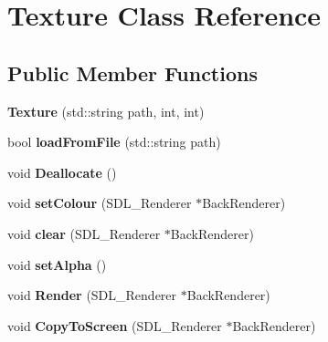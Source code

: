 \hypertarget{class_texture}{\section{Texture Class Reference}
\label{class_texture}
}
\subsection*{Public Member Functions}
\begin{DoxyCompactItemize}
\item 
\hypertarget{class_texture_aae2ae5192935d618e4f9de8d94bd89fd}{{\bfseries Texture} (std\+::string path, int, int)}\label{class_texture_aae2ae5192935d618e4f9de8d94bd89fd}

\item 
\hypertarget{class_texture_a28ddeead9d09927584663c5d2d582df2}{bool {\bfseries load\+From\+File} (std\+::string path)}\label{class_texture_a28ddeead9d09927584663c5d2d582df2}

\item 
\hypertarget{class_texture_a51f7aa720b0f538ee4dc9643d25b9fc5}{void {\bfseries Deallocate} ()}\label{class_texture_a51f7aa720b0f538ee4dc9643d25b9fc5}

\item 
\hypertarget{class_texture_a430b8ba2a5d32306903058de1bde5657}{void {\bfseries set\+Colour} (S\+D\+L\+\_\+\+Renderer $\ast$Back\+Renderer)}\label{class_texture_a430b8ba2a5d32306903058de1bde5657}

\item 
\hypertarget{class_texture_a560712606c4dc416722acf191250fddc}{void {\bfseries clear} (S\+D\+L\+\_\+\+Renderer $\ast$Back\+Renderer)}\label{class_texture_a560712606c4dc416722acf191250fddc}

\item 
\hypertarget{class_texture_ac2a59a47cceb887b1eb82788346690ad}{void {\bfseries set\+Alpha} ()}\label{class_texture_ac2a59a47cceb887b1eb82788346690ad}

\item 
\hypertarget{class_texture_a6858c96df93d340c8612cc67b038717b}{void {\bfseries Render} (S\+D\+L\+\_\+\+Renderer $\ast$Back\+Renderer)}\label{class_texture_a6858c96df93d340c8612cc67b038717b}

\item 
\hypertarget{class_texture_ad42de0731a4e4882a08b3c703807d8bb}{void {\bfseries Copy\+To\+Screen} (S\+D\+L\+\_\+\+Renderer $\ast$Back\+Renderer)}\label{class_texture_ad42de0731a4e4882a08b3c703807d8bb}


\end{DoxyCompactItemize}
